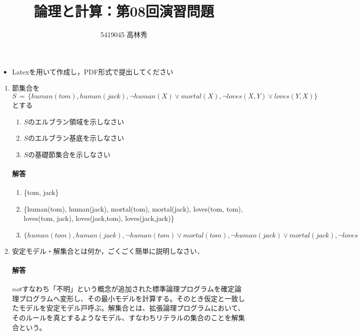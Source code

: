 \documentclass[dvipdfmx]{jsarticle}
\def\NO{08}
\def\LECTURENAME{論理と計算}
\begin{document}
\title{\LECTURENAME{}：第\NO{}回演習問題}

\author{5419045 高林秀}

\date{}
\maketitle

\begin{itemize}
\item Latexを用いて作成し，PDF形式で提出してください
\end{itemize}


\vspace*{\baselineskip}

\begin{enumerate}\setlength{\itemsep}{\baselineskip}

\item 節集合を$S\,=\,\{ human(tom), human(jack), \neg human(X)\lor mortal(X), \neg loves(X,Y)\lor loves(Y,X) \}$とする
  \begin{enumerate}
  \item $S$のエルブラン領域を示しなさい
  \item $S$のエルブラン基底を示しなさい
  \item $S$の基礎節集合を示しなさい
  \end{enumerate}
\paragraph{解答}
\begin{enumerate}
  \item \{tom, jack\}
  \item \{human(tom), human(jack), mortal(tom), mortal(jack), loves(tom, tom), loves(tom, jack), loves(jack,tom), loves(jack,jack)\}
  \item $\{human(tom), human(jack), \neg human(tom) \vee mortal(tom), \neg human(jack) \vee mortal(jack), \neg loves(tom, jack) \vee loves(jack, tom), \neg loves(jack, tom) \vee loves(tom, jack)\}$
\end{enumerate}


\item 安定モデル・解集合とは何か，ごくごく簡単に説明しなさい．
\paragraph{解答}$not$すなわち「不明」という概念が追加された標準論理プログラムを確定論理プログラムへ変形し、その最小モデルを計算する。そのとき仮定と一致したモデルを安定モデル戸呼ぶ。解集合とは、拡張論理プログラムにおいて、そのルールを真とするようなモデル、すなわちリテラルの集合のことを解集合という。



\end{enumerate}
\end{document}
